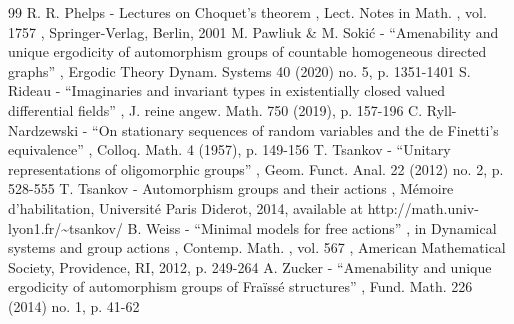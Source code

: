 \documentclass[11pt]{article}
\theoremstyle{plain}
\theoremstyle{definition}
\begin{document}
\begin{thebibliography}{99}
 R. R. Phelps - Lectures on Choquet’s theorem , Lect. Notes in Math. , vol. 1757 , Springer-Verlag, Berlin, 2001
 M. Pawliuk \& M. Sokić - “Amenability and unique ergodicity of automorphism groups of countable homogeneous directed graphs” , Ergodic Theory Dynam. Systems 40 (2020) no. 5, p. 1351-1401
 S. Rideau - “Imaginaries and invariant types in existentially closed valued differential fields” , J. reine angew. Math. 750 (2019), p. 157-196
 C. Ryll-Nardzewski - “On stationary sequences of random variables and the de Finetti’s equivalence” , Colloq. Math. 4 (1957), p. 149-156
 T. Tsankov - “Unitary representations of oligomorphic groups” , Geom. Funct. Anal. 22 (2012) no. 2, p. 528-555
 T. Tsankov - Automorphism groups and their actions , Mémoire d’habilitation, Université Paris Diderot, 2014, available at http://math.univ-lyon1.fr/\textasciitilde{}tsankov/
 B. Weiss - “Minimal models for free actions” , in Dynamical systems and group actions , Contemp. Math. , vol. 567 , American Mathematical Society, Providence, RI, 2012, p. 249-264
 A. Zucker - “Amenability and unique ergodicity of automorphism groups of Fraïssé structures” , Fund. Math. 226 (2014) no. 1, p. 41-62
\end{thebibliography}
\end{document}
